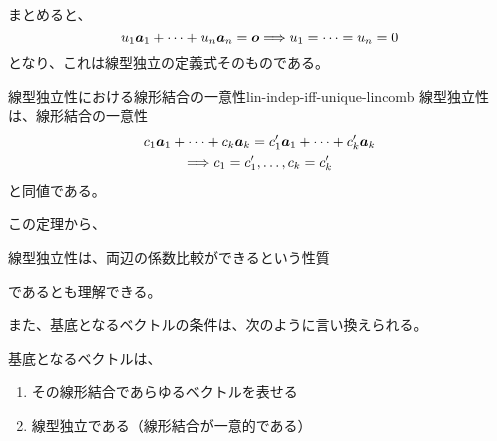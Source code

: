 \documentclass[../../../topic_linear-algebra]{subfiles}
\begin{document}
\br

まとめると、
\begin{equation*}
  u_1 \vb*{a}_1 + \cdots + u_n \vb*{a}_n = \vb*{o} \Longrightarrow u_1 = \cdots = u_n = 0
\end{equation*}
となり、これは線型独立の定義式そのものである。

\begin{theorem}{線型独立性における線形結合の一意性}{lin-indep-iff-unique-lincomb}
  線型独立性は、線形結合の一意性
  \begin{gather*}
    c_1 \vb*{a}_1 + \cdots + c_k \vb*{a}_k = c'_1 \vb*{a}_1 + \cdots + c'_k \vb*{a}_k \\ \Longrightarrow c_1 = c'_1, \dots, c_k = c'_k
  \end{gather*}
  と同値である。
\end{theorem}

この定理から、
\begin{emphabox}
  \begin{spacebox}
    \begin{center}
      線型独立性は、両辺の係数比較ができるという性質
    \end{center}
  \end{spacebox}
\end{emphabox}
であるとも理解できる。

\br

また、基底となるベクトルの条件は、次のように言い換えられる。

\begin{emphabox}
  \begin{spacebox}
    基底となるベクトルは、
    \begin{enumerate}[label=\romanlabel]
      \item その線形結合であらゆるベクトルを表せる
      \item 線型独立である（線形結合が一意的である）
    \end{enumerate}
  \end{spacebox}
\end{emphabox}
\end{document}
